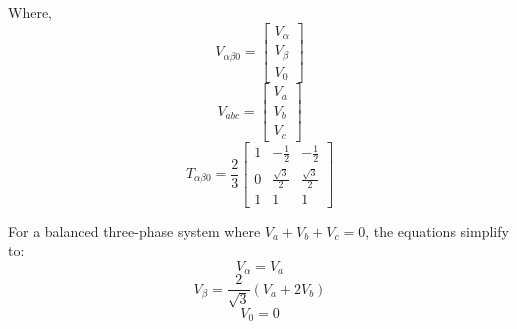 \noindent
Where,
\begin{equation*}
    V_{\alpha\beta0} = \begin{bmatrix}
        V_\alpha \\
        V_\beta  \\
        V_0
    \end{bmatrix}
\end{equation*}
\begin{equation*}
    V_{abc} = \begin{bmatrix}
        V_a \\
        V_b \\
        V_c
    \end{bmatrix}
\end{equation*}
\begin{equation*}
    T_{\alpha\beta0} = \frac{2}{3}
    \begin{bmatrix}
        1 & -\frac{1}{2}       & -\frac{1}{2}       \\
        0 & \frac{\sqrt{3}}{2} & \frac{\sqrt{3}}{2} \\
        1 & 1                  & 1
    \end{bmatrix}
\end{equation*}

\noindent
For a balanced three-phase system where \( V_a + V_b + V_c = 0 \), the equations simplify to:
\begin{equation*}
    V_\alpha = V_a
\end{equation*}
\begin{equation*}
    V_\beta = \frac{2}{\sqrt{3}} (V_a + 2 V_b)
\end{equation*}
\begin{equation*}
    V_0 = 0
\end{equation*}